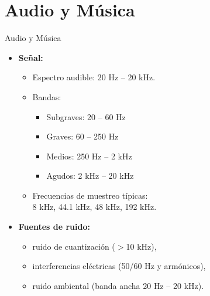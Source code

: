 \documentclass{beamer}
\numberwithin{section}{part}
\begin{document}
\section{Audio y Música}
\begin{frame}{Audio y Música}
    \begin{itemize}
        \item \textbf{Señal:}
        \begin{itemize}
            \item Espectro audible: 20 Hz – 20 kHz.
            \item Bandas:
            \begin{itemize}
                \item Subgraves: 20 – 60 Hz
                \item Graves: 60 – 250 Hz
                \item Medios: 250 Hz – 2 kHz
                \item Agudos: 2 kHz – 20 kHz
            \end{itemize}
            \item Frecuencias de muestreo típicas:\\8 kHz, 44.1 kHz, 48 kHz, 192 kHz.
        \end{itemize}
        \item \textbf{Fuentes de ruido:}
        \begin{itemize}
            \item ruido de cuantización ($>$10 kHz),
            \item interferencias eléctricas (50/60 Hz y armónicos),
            \item ruido ambiental (banda ancha 20 Hz – 20 kHz).
        \end{itemize}
    \end{itemize}
\end{frame}
\end{document}
